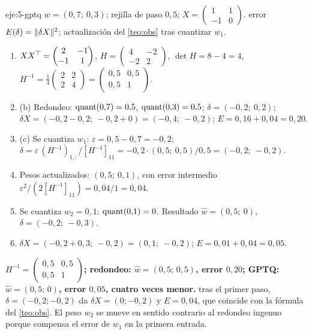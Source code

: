 \begin{solucion}{eje:5-gptq}
\datos $w=(0{,}7;\allowbreak\ 0{,}3)$; rejilla de paso $0{,}5$; $X=\begin{pmatrix}1 & 1\\ -1 & 0\end{pmatrix}$.
\planteamiento error $E(\delta)=\lVert\delta X\rVert^{2}$; actualización del \cref{teo:obs} tras cuantizar $w_1$.
\pasos
\begin{enumerate}[label=\arabic*.]
  \item $XX^{\top}=\begin{pmatrix}2 & -1\\ -1 & 1\end{pmatrix}$, $H=\begin{pmatrix}4 & -2\\ -2 & 2\end{pmatrix}$, $\det H=8-4=4$, $H^{-1}=\frac14\begin{pmatrix}2 & 2\\ 2 & 4\end{pmatrix}=\begin{pmatrix}0{,}5 & 0{,}5\\ 0{,}5 & 1\end{pmatrix}$.
  \item (b) Redondeo: $\operatorname{quant}(0{,}7)=0{,}5$, $\operatorname{quant}(0{,}3)=0{,}5$; $\delta=(-0{,}2;\allowbreak\ 0{,}2)$; $\delta X=(-0{,}2-0{,}2;\allowbreak\ -0{,}2+0)=(-0{,}4;\allowbreak\ -0{,}2)$; $E=0{,}16+0{,}04=0{,}20$.
  \item (c) Se cuantiza $w_1$: $\varepsilon=0{,}5-0{,}7=-0{,}2$; $\delta=\varepsilon\,(H^{-1})_{1,:}/[H^{-1}]_{11}=-0{,}2\cdot(0{,}5;\allowbreak\ 0{,}5)/0{,}5=(-0{,}2;\allowbreak\ -0{,}2)$.
  \item Pesos actualizados: $(0{,}5;\allowbreak\ 0{,}1)$, con error intermedio $\varepsilon^{2}/(2[H^{-1}]_{11})=0{,}04/1=0{,}04$.
  \item Se cuantiza $w_2=0{,}1$: $\operatorname{quant}(0{,}1)=0$. Resultado $\hat w=(0{,}5;\allowbreak\ 0)$, $\delta=(-0{,}2;\allowbreak\ -0{,}3)$.
  \item $\delta X=(-0{,}2+0{,}3;\allowbreak\ -0{,}2)=(0{,}1;\allowbreak\ -0{,}2)$; $E=0{,}01+0{,}04=0{,}05$.
\end{enumerate}
\resultado \textbf{$H^{-1}=\begin{pmatrix}0{,}5 & 0{,}5\\ 0{,}5 & 1\end{pmatrix}$; redondeo: $\hat w=(0{,}5;\allowbreak\,0{,}5)$, error $0{,}20$; GPTQ: $\hat w=(0{,}5;\allowbreak\,0)$, error $0{,}05$, cuatro veces menor.}
\comprobacion tras el primer paso, $\delta=(-0{,}2;-0{,}2)$ da $\delta X=(0;-0{,}2)$ y $E=0{,}04$, que coincide con la fórmula del \cref{teo:obs}. El peso $w_2$ se mueve en sentido contrario al redondeo ingenuo porque compensa el error de $w_1$ en la primera entrada.
\end{solucion}

